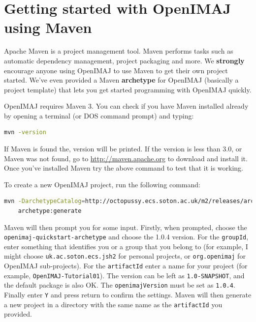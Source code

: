 \chapter{Getting started with OpenIMAJ using Maven}
\pagestyle{headings}
Apache Maven is a project management tool.  Maven performs tasks such 
as automatic  dependency management, project packaging and more. We \textbf{strongly} 
encourage anyone using OpenIMAJ to use Maven to get their own project started. 
We've even provided a Maven \textbf{archetype} for OpenIMAJ (basically a project template) 
that lets you get started programming with OpenIMAJ quickly. 

OpenIMAJ requires Maven 3. You can check if you have Maven installed already 
by opening a terminal (or DOS command prompt) and typing:
\begin{lstlisting}[language=bash]
mvn -version
\end{lstlisting}
If Maven is found the, version will be printed. If the version is less than 3.0, 
or Maven was not found, go to \url{http://maven.apache.org} to download and 
install it. Once you've installed Maven try the above command to test that it 
is working.

To create a new OpenIMAJ project, run the following command:
\begin{lstlisting}[language=bash]
mvn -DarchetypeCatalog=http://octopussy.ecs.soton.ac.uk/m2/releases/archetype-catalog.xml 
	archetype:generate
\end{lstlisting}

Maven will then prompt you for some input.  Firstly, when prompted, choose 
the \texttt{openimaj-quickstart-archetype} and choose the 1.0.4 version. For the \verb+groupId+, 
enter something that identifies you or a group that you belong to (for example, I might choose 
\verb+uk.ac.soton.ecs.jsh2+ for personal projects, or \verb+org.openimaj+ for OpenIMAJ sub-projects). 
For the \verb+artifactId+ enter a name for your project (for example, \verb+OpenIMAJ-Tutorial01+). The 
version can be left as \verb+1.0-SNAPSHOT+, and the default package is also OK. The 
\verb+openimajVersion+ must be set as \verb+1.0.4+. Finally enter \verb+Y+ and press return
to confirm the settings. Maven will then generate a new project in a directory with the same 
name as the \verb+artifactId+ you provided.


